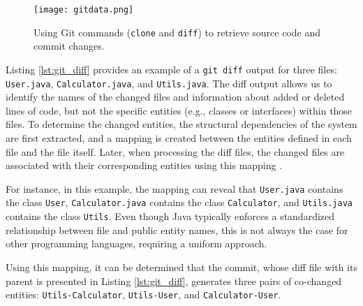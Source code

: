 \begin{figure}[H]
\centering
\texttt{[image: gitdata.png]}
\caption{Using Git commands (\texttt{clone} and \texttt{diff}) to retrieve source code and commit changes.}
\label{fig:extracting_data_with_git}
\end{figure}


Listing \ref{lst:git_diff} provides an example of a \texttt{git diff} output for three files: \texttt{User.java}, \texttt{Calculator.java}, and \texttt{Utils.java}. The diff output allows us to identify the names of the changed files and information about added or deleted lines of code, but not the specific entities (e.g., classes or interfaces) within those files. To determine the changed entities, the structural dependencies of the system are first extracted, and a mapping is created between the entities defined in each file and the file itself. Later, when processing the diff files, the changed files are associated with their corresponding entities using this mapping \cite{DepSACI, b4, icstcc-2024, enase19}.

For instance, in this example, the mapping can reveal that \texttt{User.java} contains the class \texttt{User}, \texttt{Calculator.java} contains the class \texttt{Calculator}, and \texttt{Utils.java} contains the class \texttt{Utils}. Even though Java typically enforces a standardized relationship between file and public entity names, this is not always the case for other programming languages, requiring a uniform approach.

Using this mapping, it can be determined that the commit, whose diff file with its parent is presented in Listing \ref{lst:git_diff}, generates three pairs of co-changed entities: \texttt{Utils-Calculator}, \texttt{Utils-User}, and \texttt{Calculator-User}.

